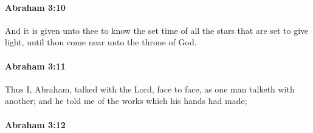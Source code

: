 		\paragraph{Abraham 3:10} %
			\label{ABRAHAM-3-10}

			And it is given unto thee to know the set time of all the stars that are set to give light, until thou come near unto the throne of God.


		\paragraph{Abraham 3:11} %
			\label{ABRAHAM-3-11}

			Thus I, Abraham, talked with the Lord, face to face, as one man talketh with another; and he told me of the works which his hands had made;


		\paragraph{Abraham 3:12} %
			\label{ABRAHAM-3-12}

